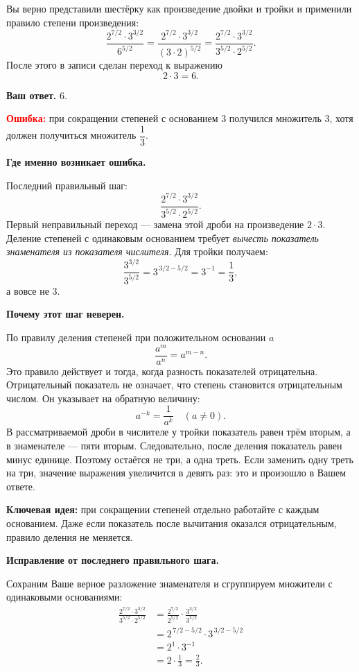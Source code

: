 \documentclass[12pt,a4paper]{article}
\begin{document}
Вы верно представили шестёрку как произведение двойки и тройки
и применили правило степени произведения:
\[
\frac{2^{7/2}\cdot3^{3/2}}{6^{5/2}}
=
\frac{2^{7/2}\cdot3^{3/2}}{(3\cdot2)^{5/2}}
=
\frac{2^{7/2}\cdot3^{3/2}}
     {3^{5/2}\cdot2^{5/2}}.
\]
После этого в записи сделан переход к выражению
\[
2\cdot3=6.
\]

\textbf{Ваш ответ.} \(\boxed{6}\).

\textcolor{red}{\textbf{Ошибка:}} при сокращении степеней
с основанием \(3\) получился множитель \(3\), хотя
должен получиться множитель \(\dfrac13\).

\textbf{Где именно возникает ошибка.}

Последний правильный шаг:
\[
\frac{2^{7/2}\cdot3^{3/2}}
     {3^{5/2}\cdot2^{5/2}}.
\]
Первый неправильный переход --- замена этой дроби
на произведение \(2\cdot3\).
Деление степеней с одинаковым основанием требует
\emph{вычесть показатель знаменателя из показателя числителя}.
Для тройки получаем:
\[
\frac{3^{3/2}}{3^{5/2}}
=3^{\,3/2-5/2}
=3^{-1}
=\frac13,
\]
а вовсе не \(3\).

\textbf{Почему этот шаг неверен.}

По правилу деления степеней при положительном основании \(a\)
\[
\frac{a^m}{a^n}=a^{m-n}.
\]
Это правило действует и тогда, когда разность показателей
отрицательна. Отрицательный показатель не означает,
что степень становится отрицательным числом.
Он указывает на обратную величину:
\[
a^{-k}=\frac{1}{a^k}\quad (a\ne0).
\]
В рассматриваемой дроби в числителе у тройки показатель
равен трём вторым, а в знаменателе --- пяти вторым.
Следовательно, после деления показатель равен
минус единице. Поэтому остаётся не три, а одна треть.
Если заменить одну треть на три, значение выражения
увеличится в девять раз: это и произошло в Вашем ответе.

\textcolor{blue!60!black}{\textbf{Ключевая идея:}}
при сокращении степеней отдельно работайте
с каждым основанием. Даже если показатель
после вычитания оказался отрицательным,
правило деления не меняется.

\textbf{Исправление от последнего правильного шага.}

Сохраним Ваше верное разложение знаменателя
и сгруппируем множители с одинаковыми основаниями:
\begin{align*}
\frac{2^{7/2}\cdot3^{3/2}}
     {3^{5/2}\cdot2^{5/2}}
&=\frac{2^{7/2}}{2^{5/2}}
  \cdot\frac{3^{3/2}}{3^{5/2}}\\
&=2^{\,7/2-5/2}\cdot3^{\,3/2-5/2}\\
&=2^1\cdot3^{-1}\\
&=2\cdot\frac13=\frac23.
\end{align*}
\end{document}
